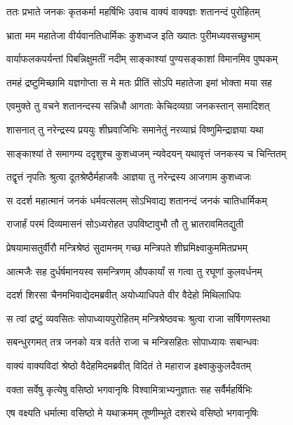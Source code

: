 
\twolineshloka
{ततः प्रभाते जनकः कृतकर्मा महर्षिभिः}
{उवाच वाक्यं वाक्यज्ञः शतानन्दं पुरोहितम्} %

\twolineshloka
{भ्राता मम महातेजा वीर्यवानतिधार्मिकः}
{कुशध्वज इति ख्यातः पुरीमध्यवसच्छुभाम्} %

\twolineshloka
{वार्याफलकपर्यन्तां पिबन्निक्षुमतीं नदीम्}
{साङ्काश्यां पुण्यसङ्काशां विमानमिव पुष्पकम्} %

\twolineshloka
{तमहं द्रष्टुमिच्छामि यज्ञगोप्ता स मे मतः}
{प्रीतिं सोऽपि महातेजा इमां भोक्ता मया सह} %

\twolineshloka
{एवमुक्ते तु वचने शतानन्दस्य सन्निधौ}
{आगताः केचिदव्यग्रा जनकस्तान् समादिशत्} %

\twolineshloka
{शासनात् तु नरेन्द्रस्य प्रययुः शीघ्रवाजिभिः}
{समानेतुं नरव्याघ्रं विष्णुमिन्द्राज्ञया यथा} %

\twolineshloka
{साङ्काश्यां ते समागम्य ददृशुश्च कुशध्वजम्}
{न्यवेदयन् यथावृत्तं जनकस्य च चिन्तितम्} %

\twolineshloka
{तद्वृत्तं नृपतिः श्रुत्वा दूतश्रेष्ठैर्महाजवैः}
{आज्ञया तु नरेन्द्रस्य आजगाम कुशध्वजः} %

\twolineshloka
{स ददर्श महात्मानं जनकं धर्मवत्सलम्}
{सोऽभिवाद्य शतानन्दं जनकं चातिधार्मिकम्} %

\twolineshloka
{राजार्हं परमं दिव्यमासनं सोऽध्यरोहत}
{उपविष्टावुभौ तौ तु भ्रातरावमितद्युती} %

\twolineshloka
{प्रेषयामासतुर्वीरौ मन्त्रिश्रेष्ठं सुदामनम्}
{गच्छ मन्त्रिपते शीघ्रमिक्ष्वाकुममितप्रभम्} %

\twolineshloka
{आत्मजैः सह दुर्धर्षमानयस्व समन्त्रिणम्}
{औपकार्यां स गत्वा तु रघूणां कुलवर्धनम्} %

\twolineshloka
{ददर्श शिरसा चैनमभिवाद्येदमब्रवीत्}
{अयोध्याधिपते वीर वैदेहो मिथिलाधिपः} %

\twolineshloka
{स त्वां द्रष्टुं व्यवसितः सोपाध्यायपुरोहितम्}
{मन्त्रिश्रेष्ठवचः श्रुत्वा राजा सर्षिगणस्तथा} %

\twolineshloka
{सबन्धुरगमत् तत्र जनको यत्र वर्तते}
{राजा च मन्त्रिसहितः सोपाध्यायः सबान्धवः} %

\twolineshloka
{वाक्यं वाक्यविदां श्रेष्ठो वैदेहमिदमब्रवीत्}
{विदितं ते महाराज इक्ष्वाकुकुलदैवतम्} %

\twolineshloka
{वक्ता सर्वेषु कृत्येषु वसिष्ठो भगवानृषिः}
{विश्वामित्राभ्यनुज्ञातः सह सर्वैर्महर्षिभिः} %

\twolineshloka
{एष वक्ष्यति धर्मात्मा वसिष्ठो मे यथाक्रमम्}
{तूष्णीम्भूते दशरथे वसिष्ठो भगवानृषिः} %

